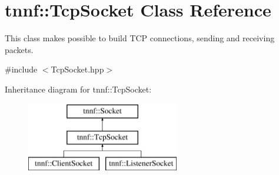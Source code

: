 \hypertarget{classtnnf_1_1_tcp_socket}{}\section{tnnf\+:\+:Tcp\+Socket Class Reference}
\label{classtnnf_1_1_tcp_socket}


This class makes possible to build T\+C\+P connections, sending and receiving packets.  




{\ttfamily \#include $<$Tcp\+Socket.\+hpp$>$}

Inheritance diagram for tnnf\+:\+:Tcp\+Socket\+:\begin{figure}[H]
\begin{center}
\leavevmode
\includegraphics[height=3.000000cm]{classtnnf_1_1_tcp_socket}
\end{center}
\end{figure}
